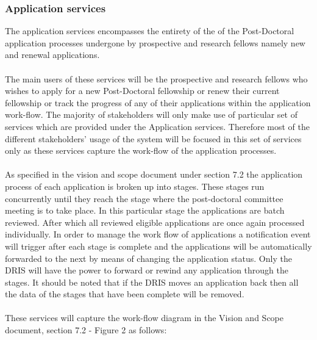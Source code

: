 \documentclass[12pt]{article}
\begin{document}
\subsubsection{Application services}
	The application services encompasses the entirety of the of the Post-Doctoral application processes undergone by prospective and research fellows namely new and renewal applications.\\\\
	The main users of these services will be the prospective and research fellows who wishes to apply for a new Post-Doctoral fellowship or renew their current fellowship or track the progress of any of their applications within the application work-flow. The majority of stakeholders will only make use of particular set of services which are provided under the Application services. Therefore most of the different stakeholders' usage of the system will be focused in this set of services only as these services capture the work-flow of the application processes. \\\\As specified in the vision and scope document under section 7.2 the application process of each application is broken up into stages. These stages run concurrently until they reach the stage where the post-doctoral committee meeting is to take place. In this particular stage the applications are batch reviewed. After which all reviewed eligible applications are once again processed individually. In order to manage the work flow of applications a notification event will trigger after each stage is complete and the applications will be automatically forwarded to the next by means of changing the application status. Only the DRIS will have the power to forward or rewind any application through the stages. It should be noted that if the DRIS moves an application back then all the data of the stages that have been complete will be removed.\\\\These services will capture the work-flow diagram in the Vision and Scope document, section 7.2 - Figure 2 as follows:
	
\end{document}
